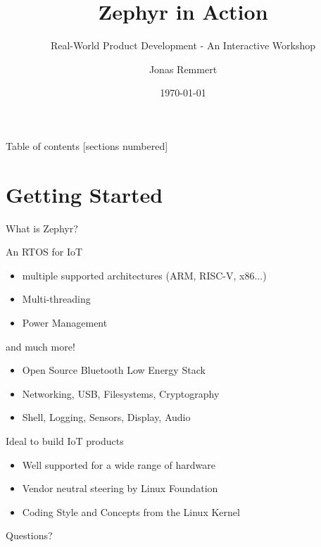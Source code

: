 \documentclass[10pt, aspectratio=169]{beamer}
\title{Zephyr in Action}
\subtitle{Real-World Product Development - An Interactive Workshop}
\date{\today}
\author{Jonas Remmert}
\begin{document}
\maketitle

\begin{frame}{Table of contents}
  [sections numbered]
  \tableofcontents[hideallsubsections]
\end{frame}

\section{Getting Started}

\begin{frame}[fragile]{What is Zephyr?}

  \begin{block}{An RTOS for IoT}
    \begin{itemize}
	\item multiple supported architectures (ARM, RISC-V, x86...)
	\item Multi-threading
	\item Power Management
    \end{itemize}
  \end{block}
  \begin{block}{and much more!}
    \begin{itemize}
	\item Open Source Bluetooth Low Energy Stack
	\item Networking, USB, Filesystems, Cryptography
	\item Shell, Logging, Sensors, Display, Audio
    \end{itemize}
  \end{block}
  \begin{block}{Ideal to build IoT products}
    \begin{itemize}
	\item Well supported for a wide range of hardware
	\item Vendor neutral steering by Linux Foundation
	\item Coding Style and Concepts from the Linux Kernel
    \end{itemize}
  \end{block}
\end{frame}


\begin{frame}[standout]
  Questions?
\end{frame}
\end{document}
